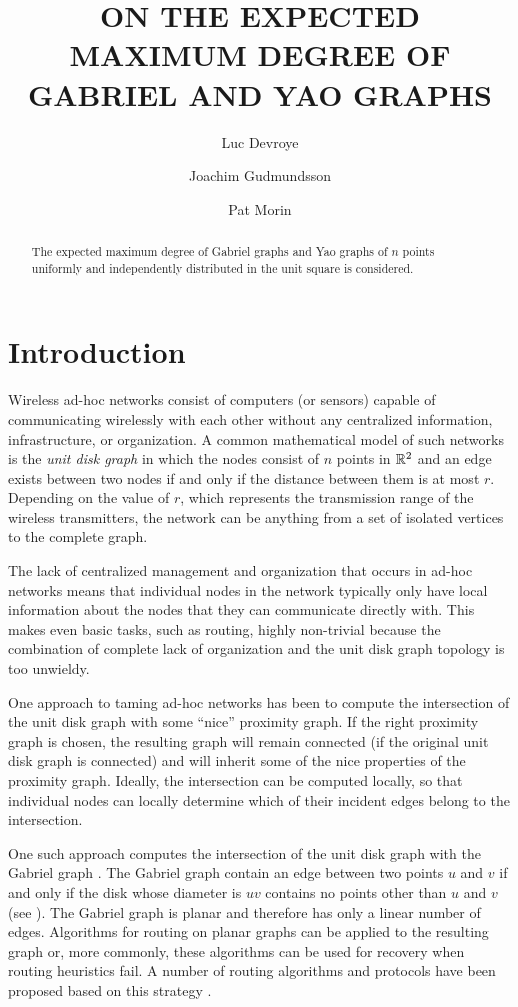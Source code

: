 \documentclass[lotsofwhite,charterfonts]{patmorin}
\title{\MakeUppercase{On the Expected Maximum Degree 
	of Gabriel and Yao Graphs}}
\author{Luc Devroye
	\and Joachim Gudmundsson
	\and Pat Morin}
\begin{document}
\linenumbers
\maketitle
\begin{abstract}
The expected maximum degree of Gabriel graphs and Yao graphs of $n$ points
uniformly and independently distributed in the unit square is considered.
\end{abstract}

\section{Introduction}

Wireless ad-hoc networks consist of computers (or sensors) capable of
communicating wirelessly with each other without any centralized
information, infrastructure, or organization.  A common mathematical model
of such networks is the \emph{unit disk graph} in which the nodes consist
of $n$ points in $\mathbb{R}^2$ and an edge exists between two nodes if and only if
the distance between them is at most $r$.  Depending on the value of $r$,
which represents the transmission range of the wireless transmitters, the
network can be anything from a set of isolated vertices to the complete
graph.

The lack of centralized management and organization that occurs in ad-hoc
networks means that individual nodes in the network typically only have
local information about the nodes that they can communicate directly with.
This makes even basic tasks, such as routing, highly non-trivial because
the combination of complete lack of organization and the unit disk graph
topology is too unwieldy.

One approach to taming ad-hoc networks has been to compute the intersection
of the unit disk graph with some ``nice'' proximity graph.  If the right
proximity graph is chosen, the resulting graph will remain connected (if
the original unit disk graph is connected) and will inherit some of the
nice properties of the proximity graph.   Ideally, the intersection can be
computed locally, so that individual nodes can locally determine which of
their incident edges belong to the intersection.

One such approach computes the intersection of the unit disk graph with
the Gabriel graph \cite{gs69}.  The Gabriel graph contain an edge between
two points $u$ and $v$ if and only if the disk whose diameter is $uv$
contains no points other than $u$ and $v$ (see ).  The
Gabriel graph is planar and therefore has only a linear number of edges.
Algorithms for routing on planar graphs can be applied to the resulting
graph or, more commonly, these algorithms can be used for recovery when
routing heuristics fail.  A number of routing algorithms and protocols
have been proposed based on this strategy \cite{bfno03,bmsu01,kk00}.
\end{document}
